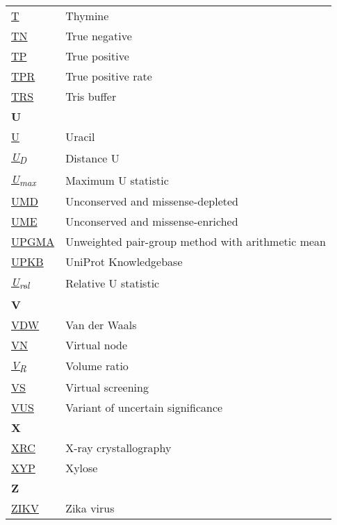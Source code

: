 \begin{longtable}[l]{@{}p{2.5cm}p{12cm}@{}}
\textmd{\href{https://en.wikipedia.org/wiki/Thymine}{T}} & Thymine \\
\textmd{\href{https://en.wikipedia.org/wiki/False_positives_and_false_negatives}{TN}} & True negative \\
\textmd{\href{https://en.wikipedia.org/wiki/False_positives_and_false_negatives}{TP}} & True positive \\
\textmd{\href{https://en.wikipedia.org/wiki/TPR}{TPR}} & True positive rate \\
\textmd{\href{https://www.ebi.ac.uk/pdbe-srv/pdbechem/chemicalCompound/show/TRS}{TRS}} & Tris buffer \\[0.3175cm]
\textbf{\large U} & \\[0.25cm]
\textmd{\href{https://en.wikipedia.org/wiki/Uracil}{U}} & Uracil \\
\textmd{\href{https://www.nature.com/articles/s42003-024-05970-8}{\textit{U\textsubscript{D}}}} & Distance U \\
\textmd{\href{https://www.nature.com/articles/s42003-024-05970-8}{\textit{U\textsubscript{max}}}} & Maximum U statistic \\
\textmd{\href{https://www.nature.com/articles/s42003-024-06117-5}{UMD}} & Unconserved and missense-depleted \\
\textmd{\href{https://www.nature.com/articles/s42003-024-06117-5}{UME}} & Unconserved and missense-enriched \\
\textmd{\href{https://en.wikipedia.org/wiki/UPGMA}{UPGMA}} & Unweighted pair-group method with arithmetic mean \\
\textmd{\href{https://www.uniprot.org/help/uniprotkb}{UPKB}} & UniProt Knowledgebase \\
\textmd{\href{https://www.nature.com/articles/s42003-024-05970-8}{\textit{U\textsubscript{rel}}}} & Relative U statistic \\[0.3175cm]
\textbf{\large V} & \\[0.25cm]
\textmd{\href{https://en.wikipedia.org/wiki/Van_der_Waals_force}{VDW}} & Van der Waals \\
\textmd{\href{https://arxiv.org/abs/2404.07194}{VN}} & Virtual node \\
\textmd{\href{https://jcheminf.biomedcentral.com/articles/10.1186/s13321-024-00923-z}{\textit{V\textsubscript{R}}}} & Volume ratio \\
\textmd{\href{https://en.wikipedia.org/wiki/Virtual_screening}{VS}} & Virtual screening \\
\textmd{\href{https://en.wikipedia.org/wiki/Variant_of_uncertain_significance}{VUS}} & Variant of uncertain significance \\[0.3175cm]
\textbf{\large X} & \\[0.25cm]
\textmd{\href{https://en.wikipedia.org/wiki/X-ray_crystallography}{XRC}} & X-ray crystallography \\
\textmd{\href{https://www.ebi.ac.uk/pdbe-srv/pdbechem/chemicalCompound/show/XYP}{XYP}} & Xylose \\[0.3175cm]
\textbf{\large Z} & \\[0.25cm]
\textmd{\href{https://en.wikipedia.org/wiki/Zika_virus}{ZIKV}} & Zika virus \\[0.3175cm]
\end{longtable}

